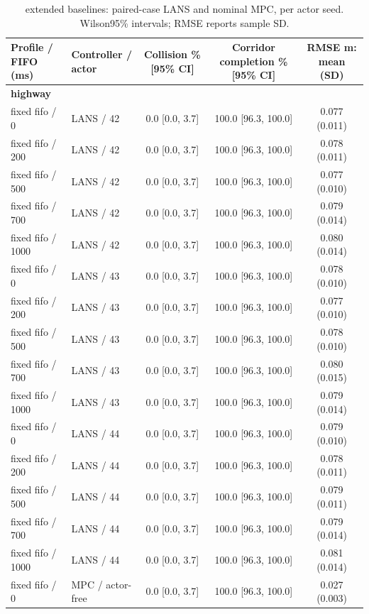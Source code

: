 \begin{longtable}{llccc}
\caption{extended baselines: paired-case LANS and nominal MPC, per actor seed. Wilson95\% intervals; RMSE reports sample SD.}\\
\toprule
Profile / FIFO (ms) & Controller / actor & Collision \% [95\% CI] & Corridor completion \% [95\% CI] & RMSE m: mean (SD) \\
\midrule
\multicolumn{5}{l}{\textbf{highway}} \\
fixed fifo / 0 & LANS / 42 & 0.0 [0.0, 3.7] & 100.0 [96.3, 100.0] & 0.077 (0.011) \\
fixed fifo / 200 & LANS / 42 & 0.0 [0.0, 3.7] & 100.0 [96.3, 100.0] & 0.078 (0.011) \\
fixed fifo / 500 & LANS / 42 & 0.0 [0.0, 3.7] & 100.0 [96.3, 100.0] & 0.077 (0.010) \\
fixed fifo / 700 & LANS / 42 & 0.0 [0.0, 3.7] & 100.0 [96.3, 100.0] & 0.079 (0.014) \\
fixed fifo / 1000 & LANS / 42 & 0.0 [0.0, 3.7] & 100.0 [96.3, 100.0] & 0.080 (0.014) \\
fixed fifo / 0 & LANS / 43 & 0.0 [0.0, 3.7] & 100.0 [96.3, 100.0] & 0.078 (0.010) \\
fixed fifo / 200 & LANS / 43 & 0.0 [0.0, 3.7] & 100.0 [96.3, 100.0] & 0.077 (0.010) \\
fixed fifo / 500 & LANS / 43 & 0.0 [0.0, 3.7] & 100.0 [96.3, 100.0] & 0.078 (0.010) \\
fixed fifo / 700 & LANS / 43 & 0.0 [0.0, 3.7] & 100.0 [96.3, 100.0] & 0.080 (0.015) \\
fixed fifo / 1000 & LANS / 43 & 0.0 [0.0, 3.7] & 100.0 [96.3, 100.0] & 0.079 (0.014) \\
fixed fifo / 0 & LANS / 44 & 0.0 [0.0, 3.7] & 100.0 [96.3, 100.0] & 0.079 (0.010) \\
fixed fifo / 200 & LANS / 44 & 0.0 [0.0, 3.7] & 100.0 [96.3, 100.0] & 0.078 (0.011) \\
fixed fifo / 500 & LANS / 44 & 0.0 [0.0, 3.7] & 100.0 [96.3, 100.0] & 0.079 (0.011) \\
fixed fifo / 700 & LANS / 44 & 0.0 [0.0, 3.7] & 100.0 [96.3, 100.0] & 0.079 (0.014) \\
fixed fifo / 1000 & LANS / 44 & 0.0 [0.0, 3.7] & 100.0 [96.3, 100.0] & 0.081 (0.014) \\
fixed fifo / 0 & MPC / actor-free & 0.0 [0.0, 3.7] & 100.0 [96.3, 100.0] & 0.027 (0.003) \\

\end{longtable}
